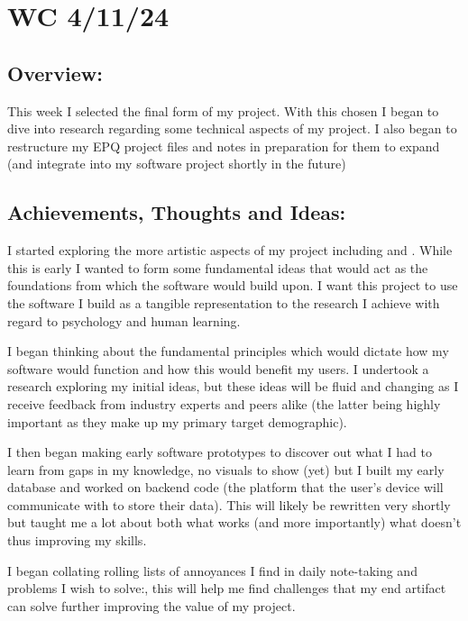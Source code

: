 \section{WC 4/11/24}

\subsection*{Overview:}
This week I selected the final form of my project. With this chosen I began to dive into research regarding some technical aspects of my project. I also began to restructure my EPQ project files and notes in preparation for them to expand (and integrate into my software project shortly in the future)

\subsection*{Achievements, Thoughts and Ideas:}
I started exploring the more artistic aspects of my project including  and . While this is early I wanted to form some fundamental ideas that would act as the foundations from which the software would build upon. I want this project to use the software I build as a tangible representation to the research I achieve with regard to psychology and human learning.

I began thinking about the fundamental principles which would dictate how my software would function and how this would benefit my users. I undertook a  research exploring my initial ideas, but these ideas will be fluid and changing as I receive feedback from industry experts and peers alike (the latter being highly important as they make up my primary target demographic).

I then began making early software prototypes to discover out what I had to learn from gaps in my knowledge, no visuals to show (yet) but I built my early database and worked on backend code (the platform that the user's device will communicate with to store their data). This will likely be rewritten very shortly but taught me a lot about both what works (and more importantly) what doesn't thus improving my skills.

I began collating rolling lists of annoyances I find in daily note-taking and problems I wish to solve:, this will help me find challenges that my end artifact can solve further improving the value of my project.


